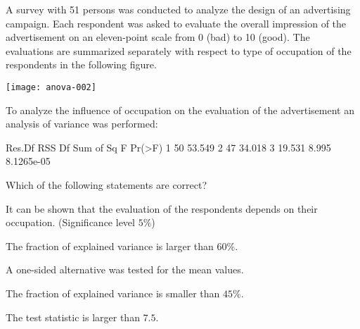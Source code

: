 
\begin{question}
A survey with 51 persons was conducted to analyze the
design of an advertising campaign. Each respondent was asked to
evaluate the overall impression of the advertisement on an
eleven-point scale from 0 (bad) to 10 (good). The evaluations are
summarized separately with respect to type of occupation of the
respondents in the following figure.

\texttt{[image: anova-002]}

To analyze the influence of occupation on the evaluation of the
advertisement an analysis of variance was performed:

\begin{Schunk}
\begin{Soutput}
  Res.Df    RSS Df Sum of Sq     F     Pr(>F)
1     50 53.549                              
2     47 34.018  3    19.531 8.995 8.1265e-05
\end{Soutput}
\end{Schunk}

Which of the following statements are correct?

\begin{answerlist}
  \item It can be shown that the evaluation of the respondents depends on their occupation. (Significance level $5\%$)
  \item The fraction of explained variance is larger than $60$\%.
  \item A one-sided alternative was tested for the mean values.
  \item The fraction of explained variance is smaller than $45$\%.
  \item The test statistic is larger than $7.5$.
\end{answerlist}
\end{question}

